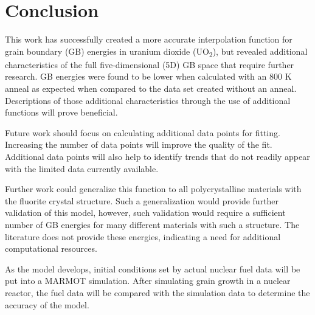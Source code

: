\documentclass[12pt]{report}
\begin{document}
\chapter{Conclusion\label{conclusion}}
This work has successfully created a more accurate interpolation function for grain boundary (GB) energies in uranium dioxide (UO\textsubscript{2}), but revealed additional characteristics of the full five-dimensional (5D) GB space that require further research.  GB energies were found to be lower when calculated with an 800 K anneal as expected when compared to the data set created without an anneal.  Descriptions of those additional characteristics through the use of additional functions will prove beneficial.  

Future work should focus on calculating additional data points for fitting.  Increasing the number of data points will improve the quality of the fit.  Additional data points will also help to identify trends that do not readily appear with the limited data currently available. 

Further work could generalize this function to all polycrystalline materials with the fluorite crystal structure.  Such a generalization would provide further validation of this model, however, such validation would require a sufficient number of GB energies for many different materials with such a structure.  The literature does not provide these energies, indicating a need for additional computational resources.

As the model develops, initial conditions set by actual nuclear fuel data will be put into a MARMOT simulation.  After simulating grain growth in a nuclear reactor, the fuel data will be compared with the simulation data to determine the accuracy of the model.
\end{document}
